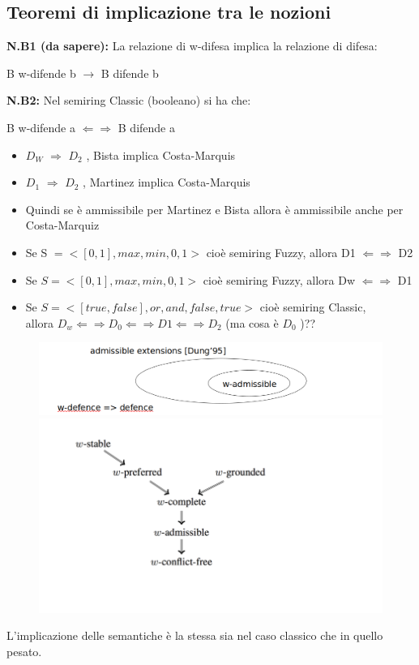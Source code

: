     \subsection{Teoremi di implicazione tra le nozioni}
    \textbf{N.B1 (da sapere):} La relazione di w-difesa implica la relazione di
    difesa:
    \begin{center}
        B w-difende b $\rightarrow$ B difende b
    \end{center}
    \textbf{N.B2:} Nel semiring Classic (booleano) si ha che:
    \begin{center}
        B w-difende a $\Leftarrow \Rightarrow$ B difende a
    \end{center}
    \begin{itemize}
        \item $D_W$ $\Rightarrow$ $D_2$ , Bista implica Costa-Marquis
        \item $D_1$ $\Rightarrow$ $D_2$ , Martinez implica Costa-Marquis
        \item Quindi se è ammissibile per Martinez e Bista allora è ammissibile
              anche per Costa-Marquiz
        \item Se S $=< [0, 1], max, min, 0, 1 > $ cioè semiring Fuzzy, allora D1
              $\Leftarrow \Rightarrow$ D2
        \item Se $S =< [0, 1], max, min, 0, 1 >$ cioè semiring Fuzzy, allora Dw
              $\Leftarrow \Rightarrow$ D1
        \item Se $S =< [true, false], or, and, false, true >$ cioè semiring
              Classic, \\allora $D_w \Leftarrow \Rightarrow D_0 \Leftarrow
                  \Rightarrow D1 \Leftarrow \Rightarrow D_2$ (ma cosa è $D_0$ )??
    \end{itemize}
    \begin{figure}[H]
        \centering
        \includegraphics[width=14cm, keepaspectratio]{img/Cap6/teor1.png}
        \includegraphics[width=14cm, keepaspectratio]{img/Cap6/teor2.png}
    \end{figure}
    L'implicazione delle semantiche è la stessa sia nel caso classico che in
    quello pesato.

